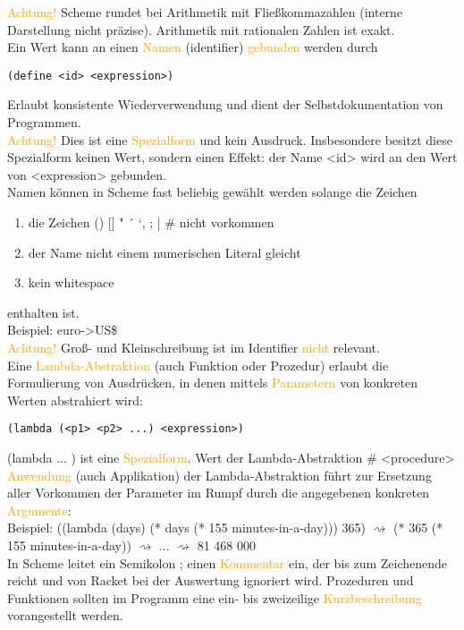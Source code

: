 \documentclass[paper=a4, fontsize=11pt]{scrartcl}
\numberwithin{equation}{section}
\numberwithin{figure}{section}
\numberwithin{table}{section}
\begin{document}
\textcolor{orange}{Achtung!} Scheme rundet bei Arithmetik mit Fließkommazahlen (interne Darstellung nicht präzise). Arithmetik mit rationalen Zahlen ist exakt. \\
Ein Wert kann an einen \textcolor{orange}{Namen} (identifier) \textcolor{orange}{gebunden} werden durch
\begin{lstlisting}
(define <id> <expression>)
\end{lstlisting}
Erlaubt konsistente Wiederverwendung und dient der Selbstdokumentation von Programmen. \\
\textcolor{orange}{Achtung!} Dies ist eine \textcolor{orange}{Spezialform} und kein Ausdruck. Insbesondere besitzt diese Spezialform keinen Wert, sondern einen Effekt: der Name  <id> wird an den Wert von <expression> gebunden. \\
Namen können in Scheme fast beliebig gewählt werden solange die Zeichen 
\begin{enumerate}
\item die Zeichen () {} [] " ´ `, ; | \# nicht vorkommen
\item der Name nicht einem numerischen Literal gleicht
\item kein whitespace 
\end{enumerate}
enthalten ist. \\
Beispiel: euro->US\$ \\
\textcolor{orange}{Achtung!} Groß- und Kleinschreibung ist im Identifier \textcolor{orange}{nicht} relevant. \\
Eine \textcolor{orange}{Lambda-Abstraktion} (auch Funktion oder Prozedur) erlaubt die Formulierung von Ausdrücken, in denen mittels \textcolor{orange}{Parametern} von konkreten Werten abstrahiert wird: 
\begin{lstlisting}
(lambda (<p1> <p2> ...) <expression>)
\end{lstlisting}
(lambda ... ) ist eine \textcolor{orange}{Spezialform}. Wert der Lambda-Abstraktion \# <procedure> \textcolor{orange}{Anwendung} (auch Applikation) der Lambda-Abstraktion führt zur Ersetzung aller Vorkommen der Parameter im Rumpf durch die angegebenen konkreten \textcolor{orange}{Argumente}: \\
Beispiel: ((lambda (days) (* days (* 155 minutes-in-a-day))) 365) $\rightsquigarrow$ (* 365 (* 155 minutes-in-a-day)) $\rightsquigarrow$ ... $\rightsquigarrow$ 81 468 000 \\

In Scheme leitet ein Semikolon ; einen \textcolor{orange}{Kommentar} ein, der bis zum Zeichenende reicht und von Racket bei der Auswertung ignoriert wird. Prozeduren und Funktionen sollten im Programm eine ein- bis zweizeilige \textcolor{orange}{Kurzbeschreibung} vorangestellt werden. \\
\end{document}
